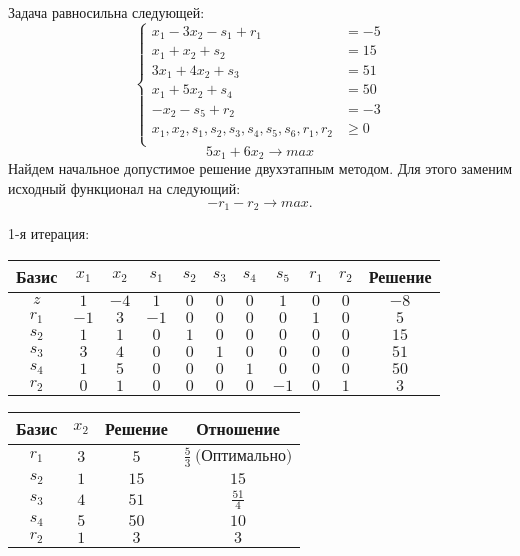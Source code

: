 \documentclass{article}%
\begin{document}
Задача равносильна следующей: %
\[%
\left\{\begin{aligned}x_{1}-3x_{2}-s_{1}+r_{1} & =-5 \\x_{1}+x_{2}+s_{2} & =15 \\3x_{1}+4x_{2}+s_{3} & =51 \\x_{1}+5x_{2}+s_{4} & =50 \\-x_{2}-s_{5}+r_{2} & =-3 \\x_{1},x_{2},s_{1},s_{2},s_{3},s_{4},s_{5},s_{6},r_{1},r_{2} & \ge 0 \\ \end{aligned}\right.%
\]%
\[%
5x_{1}+6x_{2}  \to max%
\]%
Найдем начальное допустимое решение двухэтапным методом. Для этого заменим исходный функционал на следующий: %
\[%
-r_{1}-r_{2}\to max.%
\]%
\begin{flushleft}%
1{-}я итерация: %
\newline%
\newline%
\renewcommand{\arraystretch}{1.3}%
\begin{tabular}{|c|ccccccccc|c|}%
\hline%
Базис&$x_{1}$&$x_{2}$&$s_{1}$&$s_{2}$&$s_{3}$&$s_{4}$&$s_{5}$&$r_{1}$&$r_{2}$&Решение\\%
\hline%
$z$&$1$&$-4$&$1$&$0$&$0$&$0$&$1$&$0$&$0$&$-8$\\%
\hline%
$r_{1}$&$-1$&$3$&$-1$&$0$&$0$&$0$&$0$&$1$&$0$&$5$\\%
$s_{2}$&$1$&$1$&$0$&$1$&$0$&$0$&$0$&$0$&$0$&$15$\\%
$s_{3}$&$3$&$4$&$0$&$0$&$1$&$0$&$0$&$0$&$0$&$51$\\%
$s_{4}$&$1$&$5$&$0$&$0$&$0$&$1$&$0$&$0$&$0$&$50$\\%
$r_{2}$&$0$&$1$&$0$&$0$&$0$&$0$&$-1$&$0$&$1$&$3$\\%
\hline%
\end{tabular}%
\newline%
\newline%
\newline%
\begin{tabular}{|cccc|}%
\hline%
Базис&$x_{2}$&Решение&Отношение\\%
\hline%
$r_{1}$&$3$&$5$&$\frac{5}{3}\: \text{(Оптимально)}$\\%
$s_{2}$&$1$&$15$&$15$\\%
$s_{3}$&$4$&$51$&$\frac{51}{4}$\\%
$s_{4}$&$5$&$50$&$10$\\%
$r_{2}$&$1$&$3$&$3$\\%
\hline%
\end{tabular}%
\newline%

\end{flushleft}
\end{document}
